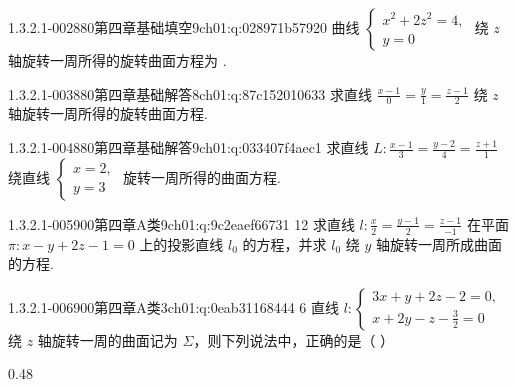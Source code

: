 \begin{q}{1.3.2.1-002}{880第四章基础填空9}{ch01:q:028971b57920}
曲线 $\begin{cases} x^2+2z^2=4, \\ y=0 \end{cases}$ 绕 $z$ 轴旋转一周所得的旋转曲面方程为 \underline{\hspace{4em}}.
\end{q}

\begin{q}{1.3.2.1-003}{880第四章基础解答8}{ch01:q:87c152010633}
求直线 $\frac{x-1}{0}=\frac{y}{1}=\frac{z-1}{2}$ 绕 $z$ 轴旋转一周所得的旋转曲面方程.
\end{q}

\begin{q}{1.3.2.1-004}{880第四章基础解答9}{ch01:q:033407f4aec1}
求直线 $L:\frac{x-1}{3}=\frac{y-2}{4}=\frac{z+1}{1}$ 绕直线 $\begin{cases} x=2, \\ y=3 \end{cases}$ 旋转一周所得的曲面方程.
\end{q}

\begin{q}{1.3.2.1-005}{900第四章A类9}{ch01:q:9c2eaef66731}
12 求直线 $l:\frac{x}{2}=\frac{y-1}{2}=\frac{z-1}{-1}$ 在平面 $\pi:x-y+2z-1=0$ 上的投影直线 $l_0$ 的方程，并求 $l_0$ 绕 $y$ 轴旋转一周所成曲面的方程.
\end{q}

\begin{q}{1.3.2.1-006}{900第四章A类3}{ch01:q:0eab31168444}
6 直线 $l:\begin{cases}3x+y+2z-2=0,\\x+2y-z-\frac{3}{2}=0\end{cases}$ 绕 $z$ 轴旋转一周的曲面记为 $\Sigma$，则下列说法中，正确的是（ ）
\begin{opts}{0.48}
\hfill{}\\[0.3ex]
\hfill{}
\end{opts}
\end{q}

